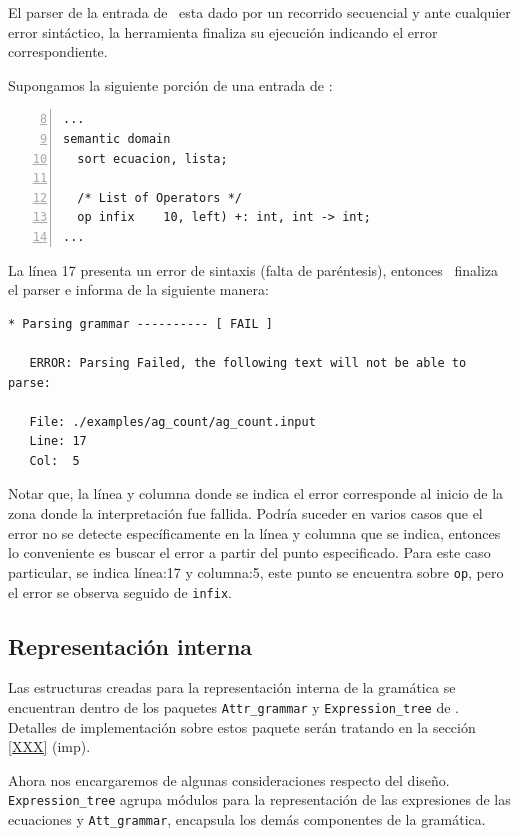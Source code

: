 El parser de la entrada de \maggen\ esta dado por un recorrido secuencial y ante cualquier error sintáctico, la herramienta finaliza su ejecución indicando el error correspondiente. 

Supongamos la siguiente porción de una entrada de \maggen:

\begin{lstlisting}[numbers=left, firstnumber=8, language=specmag, linewidth=8cm, columns=fullflexible]
...
semantic domain
  sort ecuacion, lista;

  /* List of Operators */
  op infix    10, left) +: int, int -> int;
...
\end{lstlisting}
\vspace{0.3cm}

La línea 17 presenta un error de sintaxis (falta de paréntesis), entonces \maggen\ finaliza el parser e informa de la siguiente manera:

\begin{lstlisting}[backgroundcolor=\color{white}, linewidth=15cm]
   * Parsing grammar ---------- [ FAIL ]

   ERROR: Parsing Failed, the following text will not be able to parse:

   File: ./examples/ag_count/ag_count.input
   Line: 17
   Col:  5
\end{lstlisting}
\vspace{0.3cm}

Notar que, la línea y columna donde se indica el error corresponde al inicio de la zona donde la interpretación fue fallida. Podría suceder en varios casos que el error no se detecte específicamente en la línea y columna que se indica, entonces lo conveniente es buscar el error a partir del punto especificado. Para este caso particular, se indica línea:17 y columna:5, este punto se encuentra sobre \texttt{op}, pero el error se observa seguido de \texttt{infix}.

\subsection*{Representación interna}

Las estructuras creadas para la representación interna de la gramática se encuentran dentro de los paquetes \texttt{Attr\_grammar} y \texttt{Expression\_tree} de \maggen. Detalles de implementación sobre estos paquete serán tratando en la sección \ref{XXX} (imp). 

Ahora nos encargaremos de algunas consideraciones respecto del diseño. 
\texttt{Expression\_tree} agrupa módulos para la representación de las expresiones de las ecuaciones y \texttt{Att\_grammar}, encapsula los demás componentes de la gramática.

